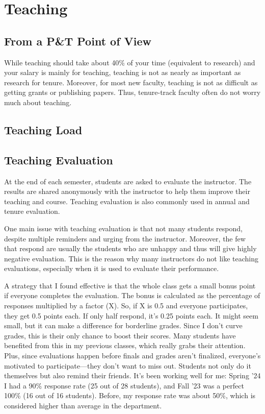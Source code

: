 \documentclass[oneside,11pt,dvipsnames]{book}
\begin{document}
\chapter{Teaching}

\section{From a P\&T Point of View}

While teaching should take about 40\% of your time (equivalent to research) and your salary is mainly for teaching, teaching is not as nearly as important as research for tenure.  Moreover, for most new faculty, teaching is not as difficult as getting grants or publishing papers. Thus, tenure-track faculty often do not worry much about teaching. 

\section{Teaching Load}
\section{Teaching Evaluation}

At the end of each semester, students are asked to evaluate the instructor. The results are shared anonymously with the instructor to help them improve their teaching and course. Teaching evaluation is also commonly used in annual and tenure evaluation.

One main issue with teaching evaluation is that not many students respond, despite multiple reminders and urging from the instructor.  Moreover, the few that respond are usually the students who are unhappy and thus will give highly negative evaluation. This is the reason why many instructors do not like teaching evaluations, especially when it is used to evaluate their performance.


A strategy that I found effective is that the whole class gets a small bonus point if everyone completes the evaluation. The bonus is calculated as the percentage of responses multiplied by a factor (X). So, if X is 0.5 and everyone participates, they get 0.5 points each. If only half respond, it's 0.25 points each. It might seem small, but it can make a difference for borderline grades. Since I don't curve grades, this is their only chance to boost their scores. Many students have benefited from this in my previous classes, which really grabs their attention. Plus, since evaluations happen before finals and grades aren't finalized, everyone's motivated to participate—they don't want to miss out. Students not only do it themselves but also remind their friends. It's been working well for me: Spring '24 I had a 90\% response rate (25 out of 28 students), and Fall '23 was a perfect 100\% (16 out of 16 students). Before, my response rate was about 50\%, which is considered higher than average in the department.
\end{document}
